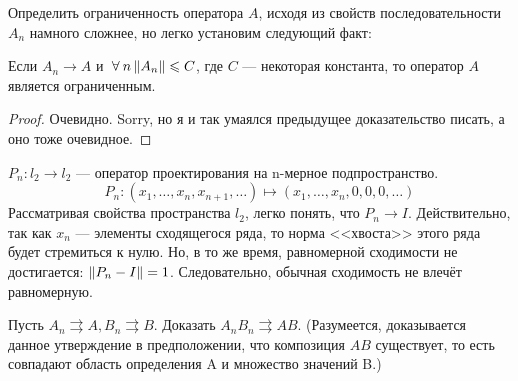 \documentclass[12pt]{article}
\begin{document}
		Определить ограниченность оператора $A$, исходя из свойств последовательности $A_n$ намного сложнее, но легко 
		установим следующий факт:
		\begin{state}
			Если $A_n \rightarrow A$ и $\forall n \norm{A_n} \leq C$, где $C$ --- некоторая константа, то 
			оператор $A$ является ограниченным.
		\end{state} 
		\begin{proof}
			Очевидно. {\color{gray}Sorry, но я и так умаялся предыдущее доказательство писать, а оно тоже очевидное.}
		\end{proof}

		\example $P_n : l_2 \rightarrow l_2$ --- оператор проектирования на n-мерное подпространство.
		$$P_n : (x_1, \dots , x_n, x_{n+1}, \dots) \longmapsto (x_1, \dots, x_n, 0, 0, 0, \dots)$$
		Рассматривая свойства пространства $l_2$, легко понять, что $P_n \rightarrow I$. Действительно, так как $x_n$ --- элементы 
		сходящегося ряда, то норма <<хвоста>> этого ряда будет стремиться к нулю.
		Но, в то же время, равномерной сходимости не достигается: $\left\| P_n - I \right\| = 1$. Следовательно, обычная сходимость не влечёт
		равномерную.
	
		\exc Пусть $A_n \rightrightarrows A, B_n \rightrightarrows B$. Доказать $A_n B_n \rightrightarrows A B$. 
		(Разумеется, доказывается данное утверждение в предположении, что композиция $A B$ существует, то есть совпадают область определения
		A и множество значений B.)
	
\end{document}

